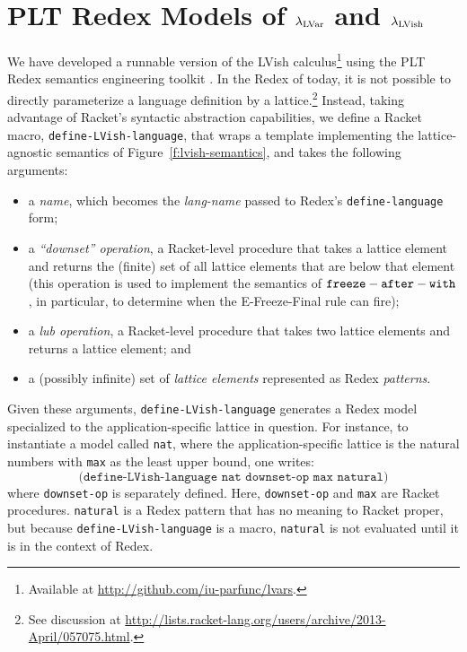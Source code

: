 \chapter{PLT Redex Models of $\lambda_{\textrm{LVar}}$ and $\lambda_{\textrm{LVish}}$}\label{app:plt-redex}


We have developed a runnable version of the LVish
calculus\footnote{Available at
  \url{http://github.com/iu-parfunc/lvars}.} using the PLT Redex
semantics engineering toolkit \cite{redex-book}.  In the Redex of
today, it is not possible to directly parameterize a language
definition by a lattice.\footnote{See discussion at
  \url{http://lists.racket-lang.org/users/archive/2013-April/057075.html}.}
Instead, taking advantage of Racket's syntactic abstraction
capabilities, we define a Racket macro,
\texttt{define-LVish-language}, that wraps a template implementing the
lattice-agnostic semantics of Figure~\ref{f:lvish-semantics}, and
takes the following arguments:
\begin{itemize}
\item a \emph{name}, which becomes the \emph{lang-name} passed to
  Redex's \texttt{define-language} form;
\item a \emph{``downset'' operation}, a Racket-level procedure that
  takes a lattice element and returns the (finite) set of all lattice
  elements that are below that element (this operation is used to
  implement the semantics of ${\mbox{\texttt{freeze}}-\mbox{\texttt{after}}-\mbox{\texttt{with}}}$, in particular, to determine when
  the {\sc E-Freeze-Final} rule can fire);
\item a \emph{lub operation}, a Racket-level procedure that takes two
  lattice elements and returns a lattice element; and
\item a (possibly infinite) set of \emph{lattice elements} represented
  as Redex \emph{patterns}.
\end{itemize}
Given these arguments, \texttt{define-LVish-language} generates a
Redex model specialized to the application-specific lattice in
question. For instance, to instantiate a model called \texttt{nat},
where the application-specific lattice is the natural numbers with
\texttt{max} as the least upper bound, one writes:
\[
\texttt{(define-LVish-language nat downset-op max natural)}
\]
where \texttt{downset-op} is separately defined.  Here,
\texttt{downset-op} and \texttt{max} are Racket procedures.
\texttt{natural} is a Redex pattern that has no meaning to Racket
proper, but because \texttt{define-LVish-language} is a macro,
\texttt{natural} is not evaluated until it is in the context of
Redex.





